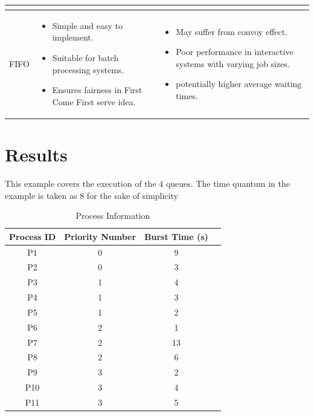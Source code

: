 \documentclass{article}
\begin{document}
\begin{table}[h]
{\begin{tabular}{|p{3cm}|p{6cm}|p{6cm}|}
\begin{itemize}
        \end{itemize} \\
      \hline
      \multirow{3}{*}{FIFO} 
      & \begin{itemize}
          \item Simple and easy to implement.
          \item Suitable for batch processing systems.
          \item Ensures fairness in First Come First serve idea.
        \end{itemize}
      & \begin{itemize}
          \item May suffer from convoy effect.
          \item Poor performance in interactive systems with varying job sizes.
          \item potentially higher average waiting times.
        \end{itemize} \\
      \hline
      \end{tabular}
  }
\end{table}


\section{Results}
This example covers the execution of the 4 queues. The time quantum in the example is taken as 8 for the sake of simplicity
\begin{table}[htbp]
  \centering
  \begin{tabular}{|c|c|c|c|}
      \hline
      \textbf{Process ID} & \textbf{Priority Number} & \textbf{Burst Time (s)} \\
      \hline
      P1 & 0 & 9 \\
      P2 & 0 & 3 \\
      P3 & 1 & 4 \\
      P4 & 1 & 3 \\
      P5 & 1 & 2 \\
      P6 & 2 & 1 \\
      P7 & 2 & 13 \\
      P8 & 2 & 6 \\
      P9 & 3 & 2 \\
      P10 & 3 & 4 \\
      P11 & 3 & 5 \\
      \hline
  \end{tabular}
  \caption{Process Information}
  \label{tab:process_info}
\end{table}
\end{document}

